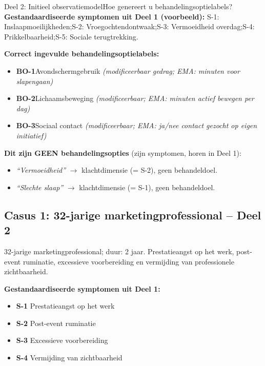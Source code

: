 \documentclass[11pt,a4paper]{article}
\begin{document}
\begin{voorbeeldbox}{Deel 2: Initieel observatiemodel}{Hoe genereert u behandelingsoptielabels?}
\small
\textbf{Gestandaardiseerde symptomen uit Deel 1 (voorbeeld):}
S-1: Inslaapmoeilijkheden;\enspace S-2: Vroegochtendontwaak;\enspace S-3: Vermoeidheid overdag;\enspace S-4: Prikkelbaarheid;\enspace S-5: Sociale terugtrekking.

\medskip
\textbf{Correct ingevulde behandelingsoptielabels:}
\begin{itemize}[topsep=2pt,itemsep=1pt]
\item \textbf{BO-1}\enspace Avondschermgebruik
  \hfill\textit{(modificeerbaar gedrag; EMA: minuten voor slapengaan)}
\item \textbf{BO-2}\enspace Lichaamsbeweging
  \hfill\textit{(modificeerbaar; EMA: minuten actief bewegen per dag)}
\item \textbf{BO-3}\enspace Sociaal contact
  \hfill\textit{(modificeerbaar; EMA: ja/nee contact gezocht op eigen initiatief)}
\end{itemize}

\medskip
\textbf{\color{StrongRed}Dit zijn GEEN behandelingsopties} (zijn symptomen, horen in Deel 1):
\begin{itemize}[topsep=1pt,itemsep=0pt]
\item \textit{``Vermoeidheid''} $\rightarrow$ klachtdimensie (= S-2), geen behandeldoel.
\item \textit{``Slechte slaap''} $\rightarrow$ klachtdimensie (= S-1), geen behandeldoel.
\end{itemize}
\end{voorbeeldbox}

\vspace{0.5em}

\newpage
\subsection*{Casus 1: 32-jarige marketingprofessional -- Deel 2}

\begin{complaintbox}[title={Casus 1: verkorte klachtomschrijving}]
\small 32-jarige marketingprofessional; duur: 2 jaar. Prestatieangst op het werk, post-event ruminatie, excessieve voorbereiding en vermijding van professionele zichtbaarheid.
\end{complaintbox}

\begin{contextbox}
\small\textbf{Gestandaardiseerde symptomen uit Deel 1:}
\begin{itemize}[topsep=2pt,itemsep=1pt]
\item \textbf{S-1} Prestatieangst op het werk
\item \textbf{S-2} Post-event ruminatie
\item \textbf{S-3} Excessieve voorbereiding
\item \textbf{S-4} Vermijding van zichtbaarheid
\end{itemize}
\end{contextbox}
\end{document}

